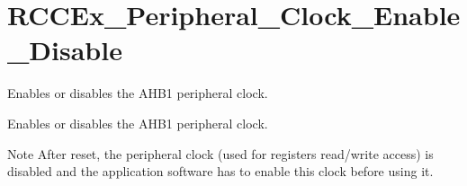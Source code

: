 \hypertarget{group___r_c_c_ex___peripheral___clock___enable___disable}{}\section{R\+C\+C\+Ex\+\_\+\+Peripheral\+\_\+\+Clock\+\_\+\+Enable\+\_\+\+Disable}
\label{group___r_c_c_ex___peripheral___clock___enable___disable}


Enables or disables the A\+H\+B1 peripheral clock.  


Enables or disables the A\+H\+B1 peripheral clock. 

\begin{DoxyNote}{Note}
After reset, the peripheral clock (used for registers read/write access) is disabled and the application software has to enable this clock before using it. 
\end{DoxyNote}
